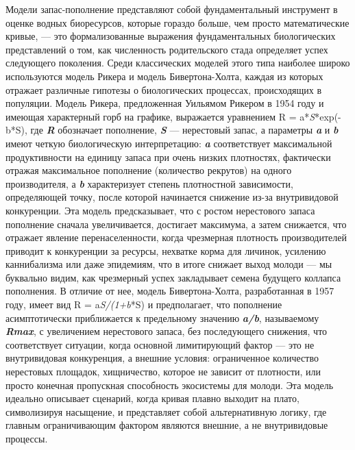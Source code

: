 \documentclass[
  letterpaper,
  DIV=11,
  numbers=noendperiod]{scrreprt}
\begin{document}
Модели запас-пополнение представляют собой фундаментальный инструмент в
оценке водных биоресурсов, которые гораздо больше, чем просто
математические кривые, --- это формализованные выражения фундаментальных
биологических представлений о том, как численность родительского стада
определяет успех следующего поколения. Среди классических моделей этого
типа наиболее широко используются модель Рикера и модель
Бивертона-Холта, каждая из которых отражает различные гипотезы о
биологических процессах, происходящих в популяции. Модель Рикера,
предложенная Уильямом Рикером в 1954 году и имеющая характерный горб на
графике, выражается уравнением R = a*\emph{S}*exp(-b*S), где
\textbf{\emph{R}} обозначает пополнение, \textbf{\emph{S}} ---
нерестовый запас, а параметры \textbf{\emph{a}} и \textbf{\emph{b}}
имеют четкую биологическую интерпретацию: \textbf{\emph{a}}
соответствует максимальной продуктивности на единицу запаса при очень
низких плотностях, фактически отражая максимальное пополнение
(количество рекрутов) на одного производителя, а \textbf{\emph{b}}
характеризует степень плотностной зависимости, определяющей точку, после
которой начинается снижение из-за внутривидовой конкуренции. Эта модель
предсказывает, что с ростом нерестового запаса пополнение сначала
увеличивается, достигает максимума, а затем снижается, что отражает
явление перенаселенности, когда чрезмерная плотность производителей
приводит к конкуренции за ресурсы, нехватке корма для личинок, усилению
каннибализма или даже эпидемиям, что в итоге снижает выход молоди --- мы
буквально видим, как чрезмерный успех закладывает семена будущего
коллапса пополнения. В отличие от нее, модель Бивертона-Холта,
разработанная в 1957 году, имеет вид R = a\emph{S/(1+b}*S) и
предполагает, что пополнение асимптотически приближается к предельному
значению \textbf{\emph{a/b}}, называемому \textbf{\emph{Rmax}}, с
увеличением нерестового запаса, без последующего снижения, что
соответствует ситуации, когда основной лимитирующий фактор --- это не
внутривидовая конкуренция, а внешние условия: ограниченное количество
нерестовых площадок, хищничество, которое не зависит от плотности, или
просто конечная пропускная способность экосистемы для молоди. Эта модель
идеально описывает сценарий, когда кривая плавно выходит на плато,
символизируя насыщение, и представляет собой альтернативную логику, где
главным ограничивающим фактором являются внешние, а не внутривидовые
процессы.
\end{document}
